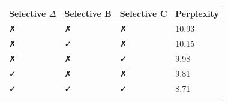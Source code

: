 \begin{tabular}{llll}
\hline
Selective $\Delta$ & Selective $\bm{B}$ & Selective $\bm{C}$ & Perplexity \\
\hline
✗ & ✗ & ✗ & 10.93 \\
✗ & ✓ & ✗ & 10.15 \\
✗ & ✗ & ✓ & 9.98 \\
✓ & ✗ & ✗ & 9.81 \\
✓ & ✓ & ✓ & 8.71 \\
\hline
\end{tabular}

